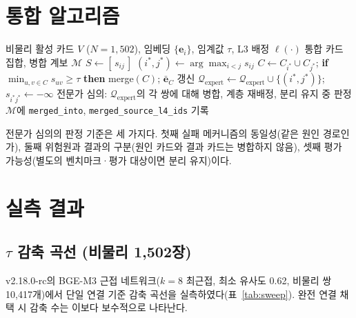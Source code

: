\documentclass[11pt,a4paper]{article}
\begin{document}
\section{통합 알고리즘}

\begin{algorithm}[htbp]
\caption{제약 완전 연결 병합 (Constrained Complete-Linkage Merge)}
\begin{algorithmic}[1]
\Require 비물리 활성 카드 $V$ ($N=1{,}502$), 임베딩 $\{\mathbf{e}_i\}$, 임계값 $\tau$, L3 배정 $\ell(\cdot)$
\Ensure 통합 카드 집합, 병합 계보 $\mathcal{M}$
\State $S \gets [\,s_{ij}\,]$ 
\Repeat
    \State $(i^*,j^*) \gets \arg\max_{i<j} s_{ij}$
         
            \State $C \gets C_{i^*} \cup C_{j^*}$;\; \textbf{if} $\min_{u,v \in C} s_{uv} \geq \tau$ \textbf{then} merge$(C)$; $\bar{\mathbf{e}}_C$ 갱신
        \Else {}
            \State $\mathcal{Q}_{\mathrm{expert}} \gets \mathcal{Q}_{\mathrm{expert}} \cup \{(i^*,j^*)\}$;\; $s_{i^*j^*} \gets -\infty$
        \EndIf
    \EndIf
{}
\State 전문가 심의: $\mathcal{Q}_{\mathrm{expert}}$의 각 쌍에 대해 병합, 계층 재배정, 분리 유지 중 판정
\State $\mathcal{M}$에 \texttt{merged\_into}, \texttt{merged\_source\_l4\_ids} 기록 
\end{algorithmic}
\end{algorithm}

전문가 심의의 판정 기준은 세 가지다. 첫째 실패 메커니즘의 동일성(같은 원인 경로인가), 둘째 위험원과 결과의 구분(원인 카드와 결과 카드는 병합하지 않음), 셋째 평가 가능성(별도의 벤치마크·평가 대상이면 분리 유지)이다.

\section{실측 결과}

\subsection{$\tau$ 감축 곡선 (비물리 1{,}502장)}

v2.18.0-rc의 BGE-M3 근접 네트워크($k=8$ 최근접, 최소 유사도 0.62, 비물리 쌍 10{,}417개)에서 단일 연결 기준 감축 곡선을 실측하였다(표~\ref{tab:sweep}). 완전 연결 채택 시 감축 수는 이보다 보수적으로 나타난다.
\end{document}
